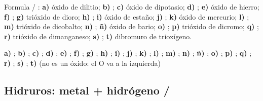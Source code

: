 \begin{exercise}
    Formula / : \textbf{a)} óxido de dilitio; \textbf{b)} ; \textbf{c)} óxido de dipotasio; \textbf{d)} ; \textbf{e)} óxido de hierro; \textbf{f)} ; \textbf{g)} trióxido de dioro; \textbf{h)} ; \textbf{i)} óxido de estaño; \textbf{j)} ; \textbf{k)} óxido de mercurio; \textbf{l)} ; \textbf{m)} trióxido de dicobalto; \textbf{n)} ; \textbf{ñ)} óxido de bario; \textbf{o)} ; \textbf{p)} trióxido de dicromo; \textbf{q)} ; \textbf{r)} trióxido de dimanganeso; \textbf{s)} ; \textbf{t)} dibromuro de trioxígeno.
    \begin{solu}
        \textbf{a)} \textcolor{red}{}; \textbf{b)} \textcolor{red}{}; \textbf{c)} \textcolor{red}{}; \textbf{d)} \textcolor{red}{}; \textbf{e)} \textcolor{red}{}; \textbf{f)} \textcolor{red}{}; \textbf{g)} \textcolor{red}{}; \textbf{h)} \textcolor{red}{}; \textbf{i)} \textcolor{red}{}; \textbf{j)} \textcolor{red}{}; \textbf{k)} \textcolor{red}{}; \textbf{l)} \textcolor{red}{}; \textbf{m)} \textcolor{red}{}; \textbf{n)} \textcolor{red}{}; \textbf{ñ)} \textcolor{red}{}; \textbf{o)} \textcolor{red}{}; \textbf{p)} \textcolor{red}{}; \textbf{q)} \textcolor{red}{}; \textbf{r)} \textcolor{red}{}; \textbf{s)} \textcolor{red}{}; \textbf{t)} \textcolor{red}{} (no es un óxido: el O va a la izquierda)
    \end{solu}
\end{exercise}

\subsection{Hidruros: metal + hidrógeno / }

